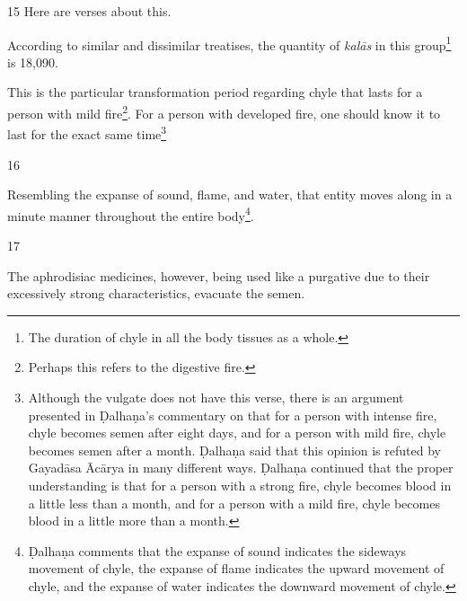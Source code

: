 \begin{translation}
\item[15] 
Here are verses about this.

\begin{sloka}
According to similar and dissimilar treatises, the quantity of \emph{kalās} in 
this group\footnote{The duration of chyle in all the body tissues as a whole.} 
is 18,090.


This is the particular transformation period regarding chyle that lasts for a person with mild fire\footnote{Perhaps this refers to the digestive fire.}. For a person with developed fire, one should know it to last for the exact same time\footnote{Although the vulgate does not have this verse, there is an argument presented in Ḍalhaṇa's commentary on  that for a person with intense fire, chyle becomes semen after eight days, and for a person with mild fire, chyle becomes semen after a month. Ḍalhaṇa said that this opinion is refuted by Gayadāsa Ācārya in many different ways. Ḍalhaṇa continued that the proper understanding is that for a person with a strong fire, chyle becomes blood in a little less than a month, and for a person 
with a mild fire, chyle becomes blood in a little more than a month.}


\end{sloka}

\item[16]

Resembling the expanse of sound, flame, and water, that entity moves along in a minute manner throughout the  entire body\footnote{Ḍalhaṇa comments \citep[63]{vulgate} that the expanse of sound indicates the sideways movement of chyle, the expanse of flame indicates the upward movement of chyle, and the expanse of water indicates the downward movement of chyle.}.

\item[17]

The aphrodisiac medicines, however, being used like a purgative due to their excessively strong characteristics, evacuate the semen.      


\end{translation}
